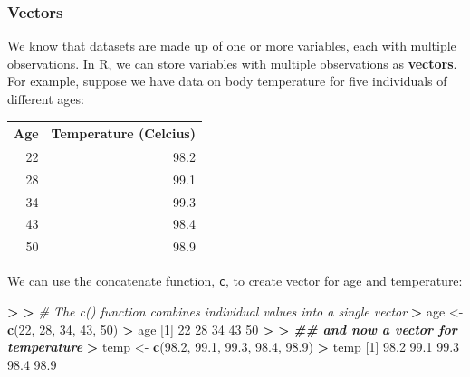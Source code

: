 \documentclass[
]{book}
\newenvironment{Shaded}{\begin{snugshade}}{\end{snugshade}}
\newcommand{\CommentTok}[1]{\textcolor[rgb]{0.56,0.35,0.01}{\textit{#1}}}
\newcommand{\DecValTok}[1]{\textcolor[rgb]{0.00,0.00,0.81}{#1}}
\newcommand{\DocumentationTok}[1]{\textcolor[rgb]{0.56,0.35,0.01}{\textbf{\textit{#1}}}}
\newcommand{\ErrorTok}[1]{\textcolor[rgb]{0.64,0.00,0.00}{\textbf{#1}}}
\newcommand{\FloatTok}[1]{\textcolor[rgb]{0.00,0.00,0.81}{#1}}
\newcommand{\FunctionTok}[1]{\textcolor[rgb]{0.13,0.29,0.53}{\textbf{#1}}}
\newcommand{\NormalTok}[1]{#1}
\newcommand{\OtherTok}[1]{\textcolor[rgb]{0.56,0.35,0.01}{#1}}
\newcommand{\SpecialCharTok}[1]{\textcolor[rgb]{0.81,0.36,0.00}{\textbf{#1}}}
\begin{document}
\subsubsection{Vectors}\label{vectors}

We know that datasets are made up of one or more variables, each with multiple observations. In R, we can store variables with multiple observations as \textbf{vectors}. For example, suppose we have data on body temperature for five individuals of different ages:

\begin{table}[H]
\centering\centering
\begin{tabular}{r|r}
\hline
\textbf{Age} & \textbf{Temperature (Celcius)}\\
\hline
22 & 98.2\\
\hline
28 & 99.1\\
\hline
34 & 99.3\\
\hline
43 & 98.4\\
\hline
50 & 98.9\\
\hline
\end{tabular}
\end{table}

We can use the concatenate function, \texttt{c}, to create vector for age and temperature:

\begin{Shaded}
\begin{Highlighting}[]
\SpecialCharTok{\textgreater{}} 
\ErrorTok{\textgreater{}} \CommentTok{\# The c() function combines individual values into a single vector}
\ErrorTok{\textgreater{}}\NormalTok{ age }\OtherTok{\textless{}{-}} \FunctionTok{c}\NormalTok{(}\DecValTok{22}\NormalTok{, }\DecValTok{28}\NormalTok{, }\DecValTok{34}\NormalTok{, }\DecValTok{43}\NormalTok{, }\DecValTok{50}\NormalTok{)}
\SpecialCharTok{\textgreater{}}\NormalTok{ age}
\NormalTok{[}\DecValTok{1}\NormalTok{] }\DecValTok{22} \DecValTok{28} \DecValTok{34} \DecValTok{43} \DecValTok{50}
\SpecialCharTok{\textgreater{}} 
\ErrorTok{\textgreater{}} \DocumentationTok{\#\# and now a vector for temperature}
\ErrorTok{\textgreater{}}\NormalTok{ temp }\OtherTok{\textless{}{-}} \FunctionTok{c}\NormalTok{(}\FloatTok{98.2}\NormalTok{, }\FloatTok{99.1}\NormalTok{, }\FloatTok{99.3}\NormalTok{, }\FloatTok{98.4}\NormalTok{, }\FloatTok{98.9}\NormalTok{)}
\SpecialCharTok{\textgreater{}}\NormalTok{ temp}
\NormalTok{[}\DecValTok{1}\NormalTok{] }\FloatTok{98.2} \FloatTok{99.1} \FloatTok{99.3} \FloatTok{98.4} \FloatTok{98.9}
\end{Highlighting}
\end{Shaded}
\end{document}
